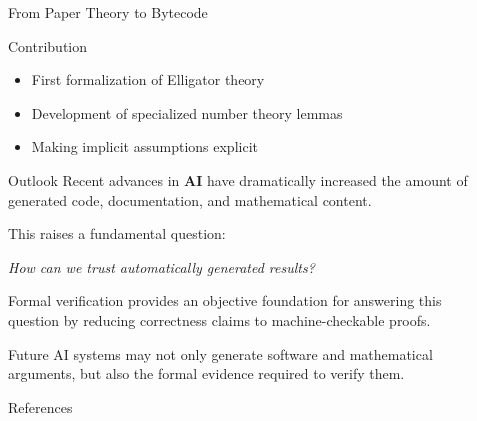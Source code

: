 \documentclass[final]{beamer}
\newlength{\sepwidth}
\newlength{\colwidth}
\newcommand{\separatorcolumn}{\begin{column}{\sepwidth}\end{column}}
\begin{document}
\begin{frame}[t]
\begin{columns}[t]
\begin{column}{\colwidth}
\begin{alertblock}{From Paper Theory to Bytecode}
\begin{center}
\end{center}

\end{alertblock}

\begin{block}{Contribution}
\begin{itemize}
    \item First formalization of Elligator theory
    \item Development of specialized number theory lemmas
    \item Making implicit assumptions explicit
\end{itemize}
\end{block}

\begin{block}{Outlook}
Recent advances in \textbf{AI} have dramatically increased the amount of generated
code, documentation, and mathematical content.

This raises a fundamental question:\\
\begin{center}
\emph{How can we trust automatically generated results?}
\end{center}

Formal verification provides an objective foundation for answering this
question by reducing correctness claims to machine-checkable proofs.

Future AI systems may not only generate software and mathematical arguments,
but also the formal evidence required to verify them.

\end{block}

\begin{block}{References}
\nocite{*}
\footnotesize{}
\end{block}

\end{column}

\separatorcolumn
\end{columns}
\end{frame}
\end{document}
